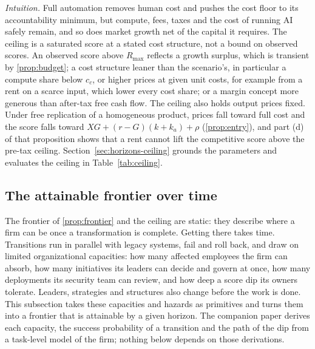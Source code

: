 \noindent\emph{Intuition.} Full automation removes human cost and pushes the cost floor to its accountability minimum, but compute, fees, taxes and the cost of running AI safely remain, and so does market growth net of the capital it requires. The ceiling is a saturated score at a stated cost structure, not a bound on observed scores. An observed score above $R_{\max}$ reflects a growth surplus, which is transient by \autoref{prop:budget}; a cost structure leaner than the scenario's, in particular a compute share below $c_c$, or higher prices at given unit costs, for example from a rent on a scarce input, which lower every cost share; or a margin concept more generous than after-tax free cash flow. The ceiling also holds output prices fixed. Under free replication of a homogeneous product, prices fall toward full cost and the score falls toward $XG+(r-G)(k+k_a)+\rho$ (\autoref{prop:entry}), and part (d) of that proposition shows that a rent cannot lift the competitive score above the pre-tax ceiling. Section~\ref{sec:horizons-ceiling} grounds the parameters and evaluates the ceiling in Table~\ref{tab:ceiling}.

\subsection{The attainable frontier over time}\label{sec:model-attainable}

The frontier of \autoref{prop:frontier} and the ceiling are static: they describe where a firm can be once a transformation is complete. Getting there takes time. Transitions run in parallel with legacy systems, fail and roll back, and draw on limited organizational capacities: how many affected employees the firm can absorb, how many initiatives its leaders can decide and govern at once, how many deployments its security team can review, and how deep a score dip its owners tolerate. Leaders, strategies and structures also change before the work is done. This subsection takes these capacities and hazards as primitives and turns them into a frontier that is attainable by a given horizon. The companion paper \citep{murthy2026transformation} derives each capacity, the success probability of a transition and the path of the dip from a task-level model of the firm; nothing below depends on those derivations.


